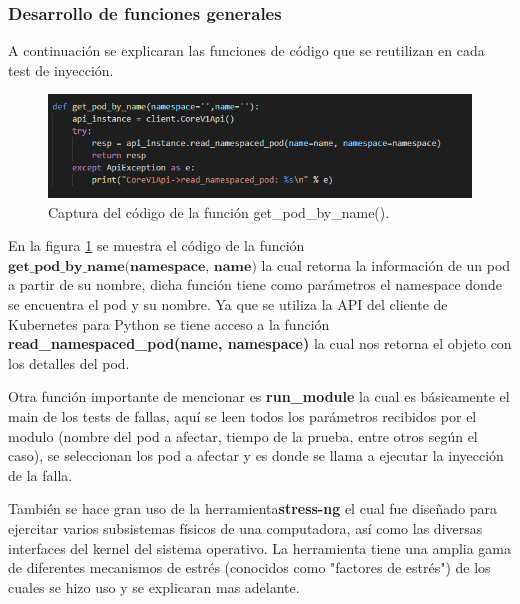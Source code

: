  

\subsubsection{Desarrollo de funciones generales}
\par A continuación se explicaran las funciones de código que se reutilizan en cada test de inyección.

\begin{figure}[htpb!]
	\centering
	\includegraphics[width=0.90\columnwidth]{images/captures/codigo/Capture_get_pod_by_name.PNG}
	\caption{Captura del código de la función get\_pod\_by\_name().}
	\label{fig:codi01}
\end{figure}

\par En la figura \ref{fig:codi01} se muestra el código de la función  $\textbf{get\_pod\_by\_name(namespace, name)}$ la cual retorna la información de un pod a partir de su nombre, dicha función tiene como parámetros el namespace donde se encuentra el pod y su nombre. Ya que se utiliza la API del cliente de Kubernetes para Python se tiene acceso a la función \textbf{read\_namespaced\_pod(name, namespace)} la cual nos retorna el objeto con los detalles del pod. \\

\par Otra función importante de mencionar es \textbf{run\_module} la cual es básicamente el main de los tests de fallas, aquí se leen todos los parámetros recibidos por el modulo (nombre del pod a afectar, tiempo de la prueba, entre otros según el caso), se seleccionan los pod a afectar y es donde se llama a ejecutar la inyección de la falla.\\

\par También se hace gran uso de la herramienta\textbf{stress-ng} el cual fue diseñado para ejercitar varios subsistemas físicos de una computadora, así como las diversas interfaces del kernel del sistema operativo. La herramienta tiene una amplia gama de diferentes mecanismos de estrés (conocidos como "factores de estrés") de los cuales se hizo uso y se explicaran mas adelante.\\

